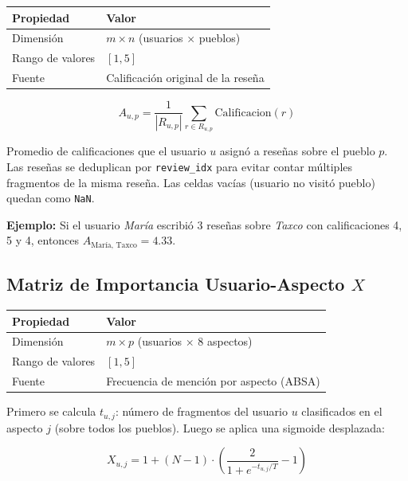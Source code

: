 \documentclass[11pt, a4paper]{article}
\begin{document}
\begin{table}[H]\centering
\begin{tabular}{ll}
\toprule
\textbf{Propiedad} & \textbf{Valor} \\
\midrule
Dimensión       & $m \times n$ (usuarios $\times$ pueblos) \\
Rango de valores & $[1, 5]$ \\
Fuente          & Calificación original de la reseña \\
\bottomrule
\end{tabular}
\end{table}

\begin{equation}
    A_{u,p} = \frac{1}{|R_{u,p}|} \sum_{r \in R_{u,p}} \text{Calificacion}(r)
\end{equation}

Promedio de calificaciones que el usuario $u$ asignó a reseñas sobre el pueblo $p$. Las reseñas se deduplican por \texttt{review\_idx} para evitar contar múltiples fragmentos de la misma reseña. Las celdas vacías (usuario no visitó pueblo) quedan como \texttt{NaN}.

\textbf{Ejemplo:} Si el usuario \textit{María} escribió 3 reseñas sobre \textit{Taxco} con calificaciones 4, 5 y 4, entonces $A_{\text{María, Taxco}} = 4.33$.

\subsection{Matriz de Importancia Usuario-Aspecto $X$}

\begin{table}[H]\centering
\begin{tabular}{ll}
\toprule
\textbf{Propiedad} & \textbf{Valor} \\
\midrule
Dimensión       & $m \times p$ (usuarios $\times$ 8 aspectos) \\
Rango de valores & $[1, 5]$ \\
Fuente          & Frecuencia de mención por aspecto (ABSA) \\
\bottomrule
\end{tabular}
\end{table}

Primero se calcula $t_{u,j}$: número de fragmentos del usuario $u$ clasificados en el aspecto $j$ (sobre todos los pueblos). Luego se aplica una sigmoide desplazada:

\begin{equation}
    X_{u,j} = 1 + (N-1) \cdot \left( \frac{2}{1 + e^{-t_{u,j} / T}} - 1 \right)
\end{equation}
\end{document}
